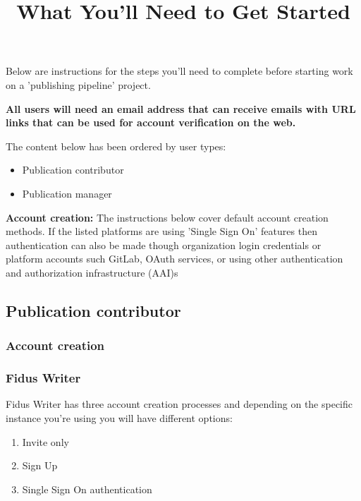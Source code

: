 \documentclass{article}
\begin{document}
\title{What You'll Need to Get Started}

\maketitle


Below are instructions for the steps you'll need to complete before starting work on a 'publishing pipeline' project.


\textbf{All users will need an email address that can receive emails with URL links that can be used for account verification on the web.}


The content below has been ordered by user types:

\begin{itemize}
\item Publication contributor


\item Publication manager


\end{itemize}

\textbf{Account creation:} The instructions below cover default account creation methods. If the listed platforms are using 'Single Sign On' features then authentication can also be made though organization login credentials or platform accounts such GitLab, OAuth services, or using other authentication and authorization infrastructure (AAI)s


\subsection{Publication contributor}\label{H8481455}



\subsubsection{Account creation}\label{H3214765}



\subsubsection{Fidus Writer}\label{H8748576}



Fidus Writer has three account creation processes and depending on the specific instance you're using you will have different options:

\begin{enumerate}
\item Invite only


\item Sign Up


\item Single Sign On authentication


\end{enumerate}
\end{document}
